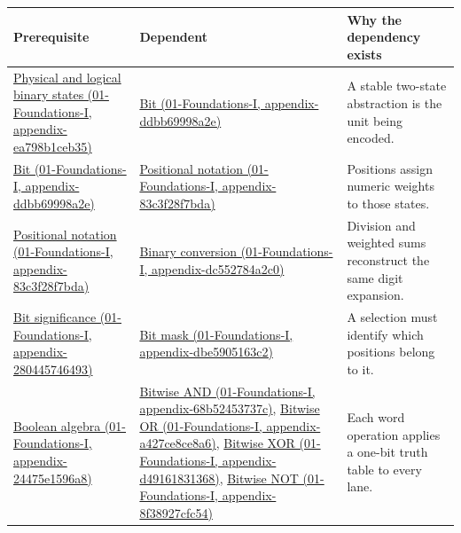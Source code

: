 {\def\LTcaptype{none} %
\begin{longtable}[]{@{}
  >{\raggedright\arraybackslash}p{}
  >{\raggedright\arraybackslash}p{}
  >{\raggedright\arraybackslash}p{}@{}}
\toprule\noalign{}
\begin{minipage}[b]{\linewidth}\raggedright
Prerequisite
\end{minipage} & \begin{minipage}[b]{\linewidth}\raggedright
Dependent
\end{minipage} & \begin{minipage}[b]{\linewidth}\raggedright
Why the dependency exists
\end{minipage} \\
\midrule\noalign{}
\endhead
\bottomrule\noalign{}
\endlastfoot
\href{../01-Foundations-I/main.pdf\#nameddest=appendix-ea798b1ceb35}{Physical and logical binary states (01-Foundations-I, appendix-ea798b1ceb35)} & \href{../01-Foundations-I/main.pdf\#nameddest=appendix-ddbb69998a2e}{Bit (01-Foundations-I, appendix-ddbb69998a2e)} & A stable two-state abstraction is the unit being encoded. \\
\href{../01-Foundations-I/main.pdf\#nameddest=appendix-ddbb69998a2e}{Bit (01-Foundations-I, appendix-ddbb69998a2e)} & \href{../01-Foundations-I/main.pdf\#nameddest=appendix-83c3f28f7bda}{Positional notation (01-Foundations-I, appendix-83c3f28f7bda)} & Positions assign numeric weights to those states. \\
\href{../01-Foundations-I/main.pdf\#nameddest=appendix-83c3f28f7bda}{Positional notation (01-Foundations-I, appendix-83c3f28f7bda)} & \href{../01-Foundations-I/main.pdf\#nameddest=appendix-dc552784a2c0}{Binary conversion (01-Foundations-I, appendix-dc552784a2c0)} & Division and weighted sums reconstruct the same digit expansion. \\
\href{../01-Foundations-I/main.pdf\#nameddest=appendix-280445746493}{Bit significance (01-Foundations-I, appendix-280445746493)} & \href{../01-Foundations-I/main.pdf\#nameddest=appendix-dbe5905163c2}{Bit mask (01-Foundations-I, appendix-dbe5905163c2)} & A selection must identify which positions belong to it. \\
\href{../01-Foundations-I/main.pdf\#nameddest=appendix-24475e1596a8}{Boolean algebra (01-Foundations-I, appendix-24475e1596a8)} & \href{../01-Foundations-I/main.pdf\#nameddest=appendix-68b52453737c}{Bitwise AND (01-Foundations-I, appendix-68b52453737c)}, \href{../01-Foundations-I/main.pdf\#nameddest=appendix-a427ce8ce8a6}{Bitwise OR (01-Foundations-I, appendix-a427ce8ce8a6)}, \href{../01-Foundations-I/main.pdf\#nameddest=appendix-d49161831368}{Bitwise XOR (01-Foundations-I, appendix-d49161831368)}, \href{../01-Foundations-I/main.pdf\#nameddest=appendix-8f38927cfc54}{Bitwise NOT (01-Foundations-I, appendix-8f38927cfc54)} & Each word operation applies a one-bit truth table to every lane. \\

\end{longtable}}
